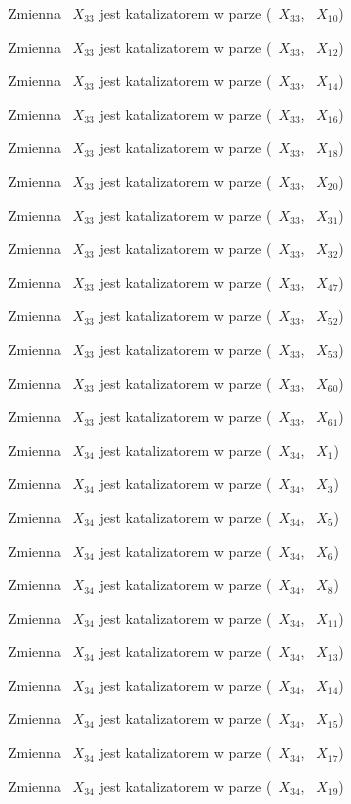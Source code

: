 \documentclass{article}
\begin{document}
Zmienna ~$X_{33}$ jest katalizatorem w parze (~$X_{33}$, ~$X_{10}$)

Zmienna ~$X_{33}$ jest katalizatorem w parze (~$X_{33}$, ~$X_{12}$)

Zmienna ~$X_{33}$ jest katalizatorem w parze (~$X_{33}$, ~$X_{14}$)

Zmienna ~$X_{33}$ jest katalizatorem w parze (~$X_{33}$, ~$X_{16}$)

Zmienna ~$X_{33}$ jest katalizatorem w parze (~$X_{33}$, ~$X_{18}$)

Zmienna ~$X_{33}$ jest katalizatorem w parze (~$X_{33}$, ~$X_{20}$)

Zmienna ~$X_{33}$ jest katalizatorem w parze (~$X_{33}$, ~$X_{31}$)

Zmienna ~$X_{33}$ jest katalizatorem w parze (~$X_{33}$, ~$X_{32}$)

Zmienna ~$X_{33}$ jest katalizatorem w parze (~$X_{33}$, ~$X_{47}$)

Zmienna ~$X_{33}$ jest katalizatorem w parze (~$X_{33}$, ~$X_{52}$)

Zmienna ~$X_{33}$ jest katalizatorem w parze (~$X_{33}$, ~$X_{53}$)

Zmienna ~$X_{33}$ jest katalizatorem w parze (~$X_{33}$, ~$X_{60}$)

Zmienna ~$X_{33}$ jest katalizatorem w parze (~$X_{33}$, ~$X_{61}$)

Zmienna ~$X_{34}$ jest katalizatorem w parze (~$X_{34}$, ~$X_{1}$)

Zmienna ~$X_{34}$ jest katalizatorem w parze (~$X_{34}$, ~$X_{3}$)

Zmienna ~$X_{34}$ jest katalizatorem w parze (~$X_{34}$, ~$X_{5}$)

Zmienna ~$X_{34}$ jest katalizatorem w parze (~$X_{34}$, ~$X_{6}$)

Zmienna ~$X_{34}$ jest katalizatorem w parze (~$X_{34}$, ~$X_{8}$)

Zmienna ~$X_{34}$ jest katalizatorem w parze (~$X_{34}$, ~$X_{11}$)

Zmienna ~$X_{34}$ jest katalizatorem w parze (~$X_{34}$, ~$X_{13}$)

Zmienna ~$X_{34}$ jest katalizatorem w parze (~$X_{34}$, ~$X_{14}$)

Zmienna ~$X_{34}$ jest katalizatorem w parze (~$X_{34}$, ~$X_{15}$)

Zmienna ~$X_{34}$ jest katalizatorem w parze (~$X_{34}$, ~$X_{17}$)

Zmienna ~$X_{34}$ jest katalizatorem w parze (~$X_{34}$, ~$X_{19}$)
\end{document}
